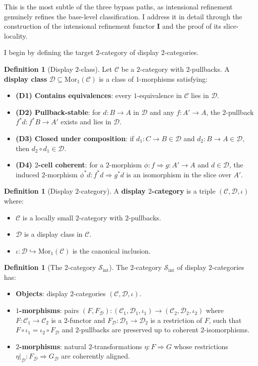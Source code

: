 \documentclass[11pt]{article}
\theoremstyle{plain}
\theoremstyle{definition}
\newtheorem{definition}[theorem]{Definition}
\newcommand{\cS}{\mathcal{S}}
\newcommand{\cC}{\mathcal{C}}
\newcommand{\cD}{\mathcal{D}}
\newcommand{\Sint}{\cS_{\mathrm{int}}}
\newcommand{\Mor}{\mathrm{Mor}}
\newcommand{\II}{\mathbf{I}}
\begin{document}
This is the most subtle of the three bypass paths, as intensional refinement genuinely refines the base-level classification. I address it in detail through the construction of the intensional refinement functor $\II$ and the proof of its slice-locality.

I begin by defining the target $2$-category of display $2$-categories.

\begin{definition}[Display $2$-class]\label{def:display-class}
Let $\cC$ be a $2$-category with $2$-pullbacks. A \textbf{display class} $\cD \subseteq \Mor_1(\cC)$ is a class of $1$-morphisms satisfying:
\begin{itemize}
\item \textbf{(D1) Contains equivalences}: every $1$-equivalence in $\cC$ lies in $\cD$.
\item \textbf{(D2) Pullback-stable}: for $d : B \to A$ in $\cD$ and any $f : A' \to A$, the $2$-pullback $f^*d : f^*B \to A'$ exists and lies in $\cD$.
\item \textbf{(D3) Closed under composition}: if $d_1 : C \to B \in \cD$ and $d_2 : B \to A \in \cD$, then $d_2 \circ d_1 \in \cD$.
\item \textbf{(D4) $2$-cell coherent}: for a $2$-morphism $\phi : f \Rightarrow g : A' \to A$ and $d \in \cD$, the induced $2$-morphism $\phi^* d : f^* d \Rightarrow g^* d$ is an isomorphism in the slice over $A'$.
\end{itemize}
\end{definition}

\begin{definition}[Display $2$-category]\label{def:display-2-cat}
A \textbf{display $2$-category} is a triple $(\cC, \cD, \iota)$ where:
\begin{itemize}
\item $\cC$ is a locally small $2$-category with $2$-pullbacks.
\item $\cD$ is a display class in $\cC$.
\item $\iota : \cD \hookrightarrow \Mor_1(\cC)$ is the canonical inclusion.
\end{itemize}
\end{definition}

\begin{definition}[The $2$-category $\Sint$]\label{def:Sint}
The $2$-category $\Sint$ of display $2$-categories has:
\begin{itemize}
\item \textbf{Objects}: display $2$-categories $(\cC, \cD, \iota)$.
\item \textbf{$1$-morphisms}: pairs $(F, F_\cD) : (\cC_1, \cD_1, \iota_1) \to (\cC_2, \cD_2, \iota_2)$ where $F : \cC_1 \to \cC_2$ is a $2$-functor and $F_\cD : \cD_1 \to \cD_2$ is a restriction of $F$, such that $F \circ \iota_1 = \iota_2 \circ F_\cD$ and $2$-pullbacks are preserved up to coherent $2$-isomorphisms.
\item \textbf{$2$-morphisms}: natural $2$-transformations $\eta : F \Rightarrow G$ whose restrictions $\eta|_\cD : F_\cD \Rightarrow G_\cD$ are coherently aligned.
\end{itemize}
\end{definition}
\end{document}
